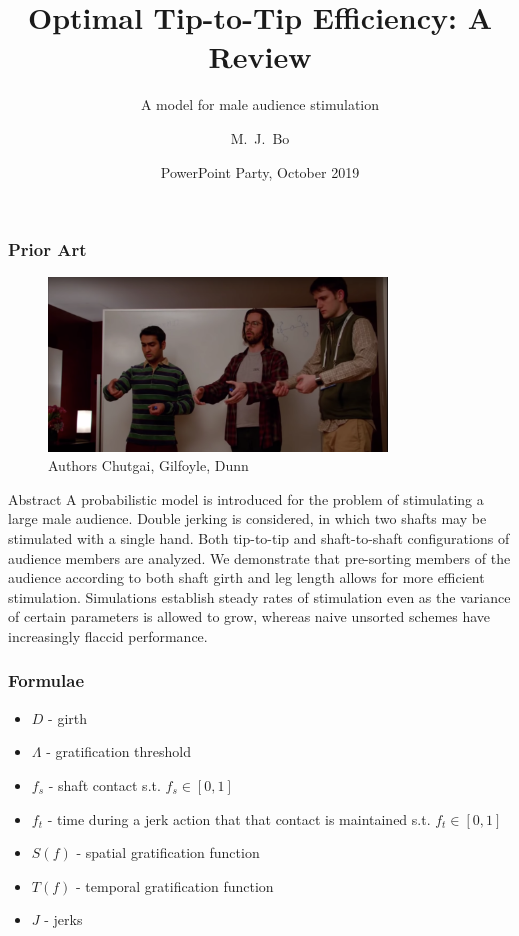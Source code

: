 \documentclass{beamer}
\title[Optimal Tip-To-Tip Efficiency: A Review] %
{Optimal Tip-to-Tip Efficiency: A Review}
\subtitle{A model for male audience stimulation}
\date[PPPT2019]{PowerPoint Party, October 2019}
\author[Bo]{M.~J.~Bo}
\begin{document}
 
\frame{\titlepage}
 
\begin{frame}
\frametitle{Prior Art}



\end{frame}

\begin{frame}
    \begin{figure}
        \caption{Authors Chutgai, Gilfoyle, Dunn     \cite{BCDGH14}}
        \includegraphics[width=9cm]{authors}
    \end{figure}
\end{frame}

\begin{frame}
    \begin{block}{Abstract}
        A probabilistic model is introduced for the problem of stimulating a large male audience. Double jerking is considered, in which two shafts may be stimulated with a single hand. Both tip-to-tip and shaft-to-shaft configurations of audience members are analyzed. We demonstrate that pre-sorting members of the audience according to both shaft girth and leg length allows for more efficient stimulation. Simulations establish steady rates of stimulation even as the variance of certain parameters is allowed to grow, whereas naive unsorted schemes have increasingly flaccid performance.
    \end{block}
\end{frame}

\begin{frame}
    \frametitle{Formulae}

    \begin{itemize}
        \item $D$ - girth\\
        \item $\Lambda$ - gratification threshold\\
        \item $f_s$ - shaft contact s.t. $f_s \in [0,1]$\\
        \item $f_t$ - time during a jerk action that that contact is maintained s.t. $f_t \in [0, 1]$\\
        \item $S(f)$ - spatial gratification function\\
        \item $T(f)$ - temporal gratification function\\
        \item $J$ - jerks
    \end{itemize}
\end{frame}
\end{document}

